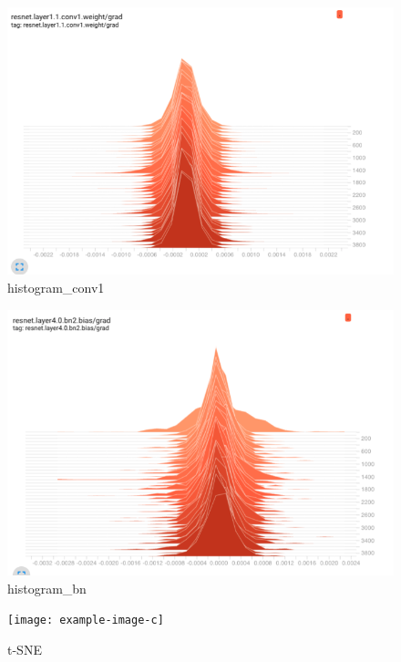 \documentclass[11pt,addpoints,answers]{exam}
\numberwithin{equation}{section} %
\numberwithin{figure}{section} %
\numberwithin{table}{section} %
\begin{document}
\begin{itemize}
\begin{figure}[H]
\centering
\includegraphics[scale=0.5]{./results/q2/hist_conv.png}
\caption{histogram\_conv1}
\label{fig:q2_histogram_conv1}
\end{figure}

\begin{figure}[H]
\centering
\includegraphics[scale=0.5]{./results/q2/hist_bn.png}
\caption{histogram\_bn}
\label{fig:q2_bn}
\end{figure}

\begin{figure}[H]
\centering
\texttt{[image: example-image-c]}
\caption{t-SNE}
\label{fig:q2_tsne}
\end{figure}

\end{itemize}
\end{document}
